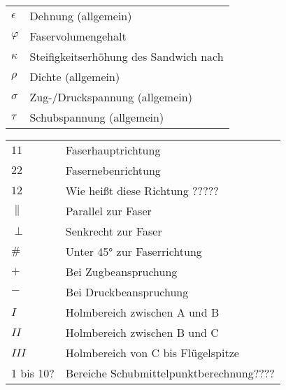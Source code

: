 \begin{table}[h]
	\begin{tabular}{ll}
		$ \epsilon $&Dehnung (allgemein)\\
		$ \varphi $&Faservolumengehalt\\
		$ \kappa $&Steifigkeitserhöhung des Sandwich nach \cite{item1}\\
		$ \rho $&Dichte (allgemein)\\
		$ \sigma $&Zug-/Druckspannung (allgemein)\\
		$ \tau $&Schubspannung (allgemein)\\
	\end{tabular}
\end{table}

\begin{table}[h]
	\begin{tabular}{ll}
		$ 11 $&Faserhauptrichtung\\
		$ 22 $&Fasernebenrichtung\\
		$ 12 $&Wie heißt diese Richtung ?????\\
		$ \parallel $&Parallel zur Faser\\
		$ \perp $&Senkrecht zur Faser\\
		$ \# $&Unter 45° zur Faserrichtung\\
		$ + $&Bei Zugbeanspruchung\\
		$ - $&Bei Druckbeanspruchung\\
		$ I $ &Holmbereich zwischen A und B\\
		$ II $ &Holmbereich zwischen B und C\\
		$ III $ &Holmbereich von C bis Flügelspitze\\
		1 bis 10? & Bereiche Schubmittelpunktberechnung????
	\end{tabular}
\end{table}


